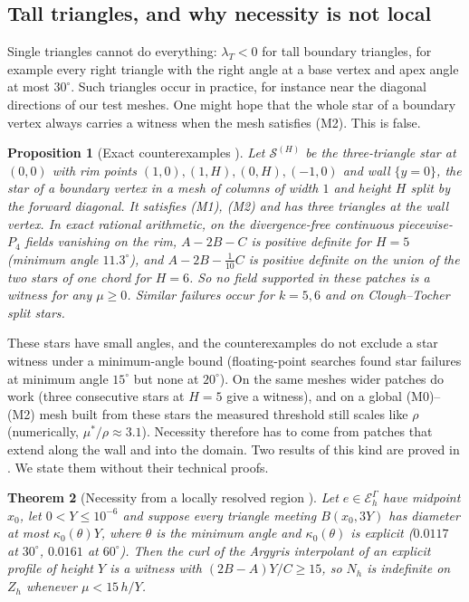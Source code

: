 \documentclass[pdflatex,sn-mathphys-num]{sn-jnl}
\theoremstyle{thmstyleone}
\newtheorem{theorem}{Theorem}[section]
\newtheorem{proposition}[theorem]{Proposition}
\theoremstyle{thmstylethree}
\newcommand{\EG}{\mathcal E_h^\Gamma}
\newcommand{\Zh}{Z_h}
\newcommand{\cS}{\mathcal S}
\begin{document}
\subsection{Tall triangles, and why necessity is not local}\label{sec:penalty:local}
Single triangles cannot do everything: $\lambda_T<0$ for tall boundary triangles, for example every right triangle with the right angle at a base vertex and apex angle at most $30^\circ$. Such triangles occur in practice, for instance near the diagonal directions of our test meshes. One might hope that the whole star of a boundary vertex always carries a witness when the mesh satisfies (M2). This is false.

\begin{proposition}[Exact counterexamples {\cite{PadhiExt}}]\label{prop:counter}
Let $\cS^{(H)}$ be the three-triangle star at $(0,0)$ with rim points $(1,0),(1,H),(0,H),(-1,0)$ and wall $\{y=0\}$, the star of a boundary vertex in a mesh of columns of width $1$ and height $H$ split by the forward diagonal. It satisfies (M1), (M2) and has three triangles at the wall vertex. In exact rational arithmetic, on the divergence-free continuous piecewise-$P_4$ fields vanishing on the rim, $A-2B-C$ is positive definite for $H=5$ (minimum angle $11.3^\circ$), and $A-2B-\frac1{10}C$ is positive definite on the union of the two stars of one chord for $H=6$. So no field supported in these patches is a witness for any $\mu\ge0$. Similar failures occur for $k=5,6$ and on Clough--Tocher split stars.
\end{proposition}

These stars have small angles, and the counterexamples do not exclude a star witness under a minimum-angle bound (floating-point searches found star failures at minimum angle $15^\circ$ but none at $20^\circ$). On the same meshes wider patches do work (three consecutive stars at $H=5$ give a witness), and on a global (M0)--(M2) mesh built from these stars the measured threshold still scales like $\rho$ (numerically, $\mu^\ast/\rho\approx3.1$). Necessity therefore has to come from patches that extend along the wall and into the domain. Two results of this kind are proved in \cite{PadhiExt}. We state them without their technical proofs.

\begin{theorem}[Necessity from a locally resolved region {\cite{PadhiExt}}]\label{thm:pbA}
Let $e\in\EG$ have midpoint $x_0$, let $0<Y\le10^{-6}$ and suppose every triangle meeting $B(x_0,3Y)$ has diameter at most $\kappa_0(\theta)Y$, where $\theta$ is the minimum angle and $\kappa_0(\theta)$ is explicit ($0.0117$ at $30^\circ$, $0.0161$ at $60^\circ$). Then the curl of the Argyris interpolant of an explicit profile of height $Y$ is a witness with $(2B-A)Y/C\ge15$, so $N_h$ is indefinite on $\Zh$ whenever $\mu<15\,h/Y$.
\end{theorem}
\end{document}
